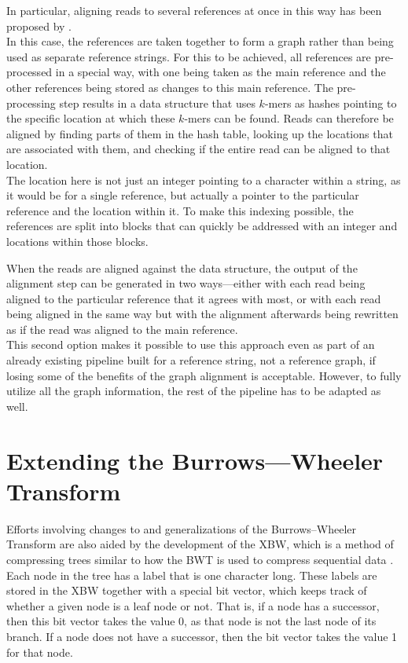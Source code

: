 \documentclass[a4paper,12pt,twoside,BCOR=10mm]{scrbook}
\begin{document}
In particular, aligning reads to several references at once
in this way has been proposed by \citet{Schneeberger2009}. \\
In this case, the references are taken together to form a graph
rather than being used as separate reference strings.
For this to be achieved, all references are pre-processed in a special way, with one being taken as the
main reference and the other references being stored as changes to this main reference.
The pre-processing step results in a data structure that uses $ k $-mers as hashes pointing
to the specific location at which these $ k $-mers can be found. Reads can therefore be aligned
by finding parts of them in the hash table, looking up the locations that are associated with
them, and checking if the entire read can be aligned to that location. \\
The location here is not just an integer pointing to a character within a string,
as it would be for a single reference, but actually
a pointer to the particular reference and the location within it.
To make this indexing possible, the references are split into blocks that
can quickly be addressed with an integer and locations within those blocks.

When the reads are aligned against the data structure, the output of the alignment step
can be generated in two ways---either with each read being aligned to the particular reference
that it agrees with most, or with each read being aligned in the same way but with the
alignment afterwards being rewritten as if the read was aligned to the main reference. \\
This second option makes it possible to use this approach even as part of an already existing pipeline
built for a reference string, not a reference graph, if losing some of the benefits of
the graph alignment is acceptable. However, to fully utilize all the graph information,
the rest of the pipeline has to be adapted as well.

\section{Extending the Burrows---Wheeler Transform}

Efforts involving changes to and generalizations of the Burrows--Wheeler Transform
are also aided by the development of the XBW, which is a
method of compressing trees similar to how the BWT is used to compress sequential data \citep{Ferragina2009}. \\
Each node in the tree has a label that is one character long.
These labels are stored in the XBW together with a special bit vector,
which keeps track of whether a given node is a leaf node or not.
That is, if a node has a successor, then this bit vector takes the value 0, as that node is not the last node
of its branch. If a node does not have a successor, then the bit vector takes the value 1 for that node. \\
\end{document}
